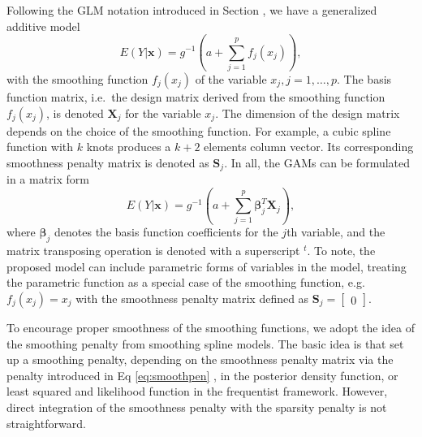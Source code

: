 \documentclass[AMA,STIX1COL,]{WileyNJD-v2}
\begin{document}
Following the GLM notation introduced in Section \label{introduction},
we have a generalized additive model \[
E(Y|\boldsymbol{x}) = g^{-1}(a + \sum\limits^p_{j=1}f_j(x_j)),
\] with the smoothing function \(f_j(x_j)\) of the variable
\(x_j, j = 1, \dots, p.\) The basis function matrix, i.e.~the design
matrix derived from the smoothing function \(f_j(x_j)\), is denoted
\(\boldsymbol{X}_j\) for the variable \(x_j\). The dimension of the
design matrix depends on the choice of the smoothing function. For
example, a cubic spline function with \(k\) knots produces a \(k+2\)
elements column vector. Its corresponding smoothness penalty matrix is
denoted as \(\boldsymbol{S}_j\). In all, the GAMs can be formulated in a
matrix form \[
E(Y|\boldsymbol{x}) = g^{-1}(a + \sum\limits^p_{j=1} \boldsymbol{\beta}_j^T \boldsymbol{X}_j),
\] where \(\boldsymbol{\beta}_j\) denotes the basis function
coefficients for the \(j\)th variable, and the matrix transposing
operation is denoted with a superscript \(^t\). To note, the proposed
model can include parametric forms of variables in the model, treating
the parametric function as a special case of the smoothing function,
e.g.~\(f_j(x_j) = x_j\) with the smoothness penalty matrix defined as
\(\boldsymbol{S}_j = \begin{bmatrix}0\end{bmatrix}\).

To encourage proper smoothness of the smoothing functions, we adopt the
idea of the smoothing penalty from smoothing spline models. The basic
idea is that set up a smoothing penalty, depending on the smoothness
penalty matrix via the penalty introduced in Eq \ref{eq:smoothpen} , in
the posterior density function, or least squared and likelihood function
in the frequentist framework. However, direct integration of the
smoothness penalty with the sparsity penalty is not straightforward.
\end{document}
